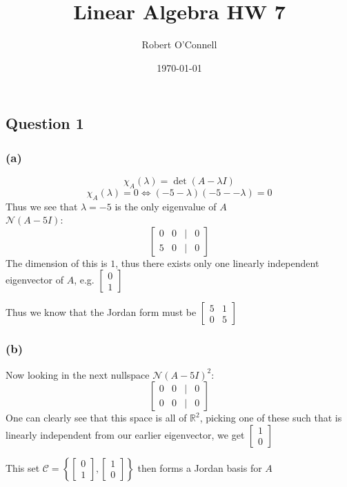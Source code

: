 \documentclass{article}
\title{\textbf{Linear Algebra HW 7}}
\author{Robert O'Connell}
\date{\today}
\begin{document}
\maketitle
\vspace{5mm}
\subsection*{Question 1}
\subsubsection*{(a)}
\[
\chi_A(\lambda) = \det(A - \lambda I)
\]
\[
\chi_A(\lambda) = 0 \iff (-5 - \lambda)(-5- -\lambda) = 0
\]
Thus we see that \(\lambda = -5\) is the only eigenvalue of \(A\)
\\

\(\mathcal{N}(A- 5 I)\):
\[
\begin{bmatrix}
    0 & 0 & | & 0 \\
    5 & 0 & | & 0 
\end{bmatrix}
\]
The dimension of this is \(1\), thus there exists only one linearly independent 
eigenvector of \(A\), e.g. \(\begin{bmatrix}
    0 \\
    1
\end{bmatrix}\)

Thus we know that the Jordan form must be \(\begin{bmatrix}
    5 & 1 \\
    0 & 5
\end{bmatrix}\)

\subsubsection*{(b)}
Now looking in the next nullspace
\(\mathcal{N}(A - 5I)^2\):
\[
\begin{bmatrix}
    0 & 0 & | & 0 \\
    0 & 0 & | & 0
\end{bmatrix}
\]
One can clearly see that this space is all of \(\mathbb{R}^2\), picking one of these 
such that is linearly independent from our earlier eigenvector, we get 
\(\begin{bmatrix}
    1 \\ 
    0
\end{bmatrix}\)

This set \(\mathcal{C} = \left\{\begin{bmatrix}
0 \\ 1
\end{bmatrix}, \begin{bmatrix}
1 \\ 0
\end{bmatrix} \right\} \) then forms a Jordan basis for \(A\)
\end{document}
